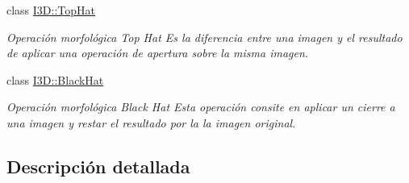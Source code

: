 \begin{DoxyCompactItemize}
class \hyperlink{class_i3_d_1_1_top_hat}{I3\+D\+::\+Top\+Hat}
\begin{DoxyCompactList}\small\item\em Operación morfológica Top Hat Es la diferencia entre una imagen y el resultado de aplicar una operación de apertura sobre la misma imagen. \end{DoxyCompactList}\item 
class \hyperlink{class_i3_d_1_1_black_hat}{I3\+D\+::\+Black\+Hat}
\begin{DoxyCompactList}\small\item\em Operación morfológica Black Hat Esta operación consite en aplicar un cierre a una imagen y restar el resultado por la la imagen original. \end{DoxyCompactList}\end{DoxyCompactItemize}


\subsection{Descripción detallada}
